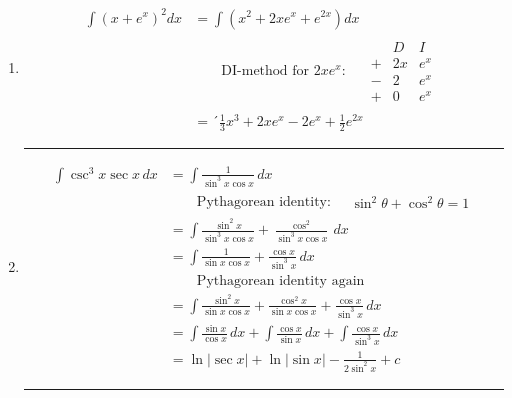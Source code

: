 \begin{enumerate}
  \item
    \begin{equation}
      \begin{aligned}
        \int (x+e^x)^2 dx
        & = \int (x^2 + 2xe^x+e^{2x}) dx \\
        & \qquad
          \text{DI-method for $2xe^x$:}
          \quad
          \boxed{
            \begin{aligned}
              \begin{array}{ccc}
                & D & I \\
               +& 2x & e^x \\
               -& 2 & e^x \\
               +& 0 & e^x
              \end{array}
            \end{aligned}
          } \\
        & =´\frac{1}{3}x^3 + 2xe^x-2e^x+\frac{1}{2}e^{2x}
      \end{aligned}
    \end{equation}
    \bigbreak
    \hrule
    \bigbreak

  \item
    \begin{equation}
      \begin{aligned}
        \int \csc^3 x \sec x \, dx
        & = \int \frac{1}{\sin^3 x \cos x} \, dx \\
        & \qquad
          \text{Pythagorean identity:}
          \quad
          \boxed{
            \begin{aligned}
              \sin^2 \theta + \cos^2 \theta = 1
            \end{aligned}
          } \\
        & = \int \frac{\sin^2 x}{\sin^3 x \cos x} + \frac{\cos^2}{\sin^3 x \cos x} \, dx \\
        & = \int \frac{1}{\sin x \cos x} + \frac{\cos x}{\sin^3 x} \, dx \\
        &  \qquad \text{Pythagorean identity again} \\
        & = \int \frac{\sin^2 x}{\sin x \cos x}+ \frac{\cos^2 x}{\sin x \cos x} + \frac{\cos x}{\sin^3 x} \, dx \\
        & = \int \frac{\sin x}{\cos x} \, dx + \int \frac{\cos x}{\sin x} \, dx + \int \frac{\cos x}{\sin^3 x} \, dx \\
        & = \ln | \sec x | + \ln | \sin x | - \frac{1}{2 \sin^2 x} + c
      \end{aligned}
    \end{equation}
    \bigbreak
    \hrule
    \bigbreak


\end{enumerate}

